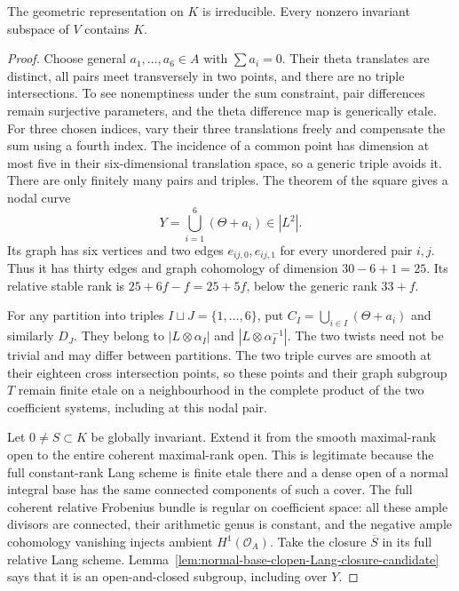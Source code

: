 \begin{lemma}
\label{lem:nonordinary-ppav-two-six-theta-comparison-candidate}
The geometric representation on $K$ is irreducible. Every
nonzero invariant subspace of $V$ contains $K$.
\end{lemma}
\begin{proof}
Choose general $a_1,\ldots,a_6\in A$ with $\sum a_i=0$.
Their theta translates are distinct, all pairs meet transversely
in two points, and there are no triple intersections. To see
nonemptiness under the sum constraint, pair differences remain
surjective parameters, and the theta difference map is generically
etale. For three chosen indices, vary their three translations
freely and compensate the sum using a fourth index. The incidence
of a common point has dimension at most five in their
six-dimensional translation space, so a generic triple avoids
it. There are only finitely many pairs and triples. The theorem
of the square gives a nodal curve
\[
                    Y=\bigcup_{i=1}^6(\Theta+a_i)\in|L^2|.
\]
Its graph has six vertices and two edges $e_{ij,0},e_{ij,1}$
for every unordered pair $i,j$. Thus it has thirty edges and
graph cohomology of dimension $30-6+1=25$. Its relative stable
rank is $25+6f-f=25+5f$, below the generic rank $33+f$.

For any partition into triples $I\sqcup J=\{1,\ldots,6\}$,
put $C_I=\bigcup_{i\in I}(\Theta+a_i)$ and similarly $D_J$.
They belong to $|L\otimes\alpha_I|$ and
$|L\otimes\alpha_I^{-1}|$. The two twists need not be trivial
and may differ between partitions. The two triple curves are
smooth at their eighteen cross intersection points, so these
points and their graph subgroup $T$ remain finite etale on a
neighbourhood in the complete product of the two coefficient
systems, including at this nodal pair.

Let $0\ne S\subset K$ be globally invariant. Extend it from
the smooth maximal-rank open to the entire coherent maximal-rank
open. This is legitimate because the full constant-rank Lang
scheme is finite etale there and a dense open of a normal
integral base has the same connected components of such a
cover. The full coherent relative Frobenius bundle is regular
on coefficient space: all these ample divisors are connected,
their arithmetic genus is constant, and the negative ample
cohomology vanishing injects ambient $H^1(\mathcal O_A)$.
Take the closure $\overline S$ in its full relative Lang scheme.
Lemma~\ref{lem:normal-base-clopen-Lang-closure-candidate} says
that it is an open-and-closed subgroup, including over $Y$.


\end{proof}
